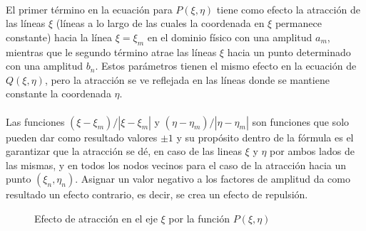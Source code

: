 \documentclass[letterpaper, openright, 12pt]{book}
\begin{document}
    \paragraph*{}
    El primer término en la ecuación para $P(\xi, \eta)$ tiene como efecto
    la atracción de las líneas $\xi$ (líneas a lo largo de las cuales la
    coordenada en $\xi$ permanece constante) hacia la línea $\xi = \xi_{m}$
    en el dominio físico con una amplitud $a_{m}$, mientras que le segundo
    término atrae las líneas $\xi$ hacia un punto determinado con una
    amplitud $b_{n}$. Estos parámetros tienen el mismo efecto en la ecuación
    de $Q(\xi, \eta)$, pero la atracción se ve reflejada en las líneas donde
    se mantiene constante la coordenada $\eta$.

    \paragraph*{}
    Las funciones $(\xi - \xi_{m}) / |\xi - \xi_{m}|$ y
    $(\eta - \eta_{m}) / |\eta - \eta_{m}|$
    son funciones que solo pueden dar como resultado valores $\pm 1$ y su
    propósito dentro de la fórmula es el garantizar que la atracción se dé,
    en caso de las lineas $\xi$ y $\eta$ por ambos lados de las mismas, y en
    todos los nodos vecinos para el caso de la atracción hacia un punto
    $(\xi_{n}, \eta_{n})$. Asignar un valor negativo a los factores de
    amplitud da como resultado un efecto contrario, es decir, se crea un
    efecto de repulsión.
    \begin{figure}[htbp!]
        \centering
        \hspace{1cm}
        \caption[Efecto de atracción por función $P(\xi,\eta)$]{Efecto de
        atracción en el eje $\xi$ por la función $P(\xi, \eta)$}
        \label{fig:densidad-xi}
        \end{figure}
\end{document}
